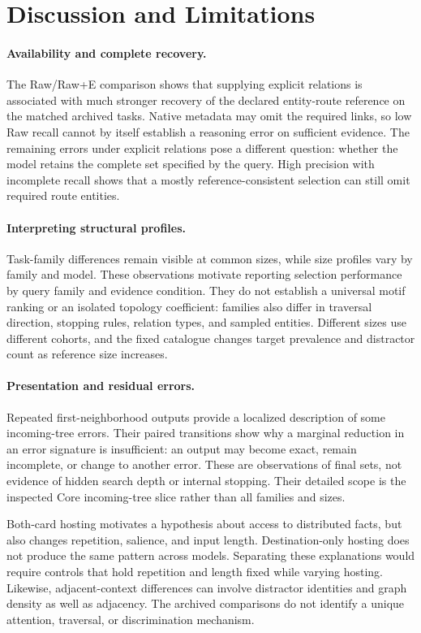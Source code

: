 \section{Discussion and Limitations}
\label{sec:discussion}
\paragraph{Availability and complete recovery.}
The Raw/Raw+E comparison shows that supplying explicit relations is associated with much stronger recovery of the declared entity-route reference on the matched archived tasks. Native metadata may omit the required links, so low Raw recall cannot by itself establish a reasoning error on sufficient evidence. The remaining errors under explicit relations pose a different question: whether the model retains the complete set specified by the query. High precision with incomplete recall shows that a mostly reference-consistent selection can still omit required route entities.

\paragraph{Interpreting structural profiles.}
Task-family differences remain visible at common sizes, while size profiles vary by family and model. These observations motivate reporting selection performance by query family and evidence condition. They do not establish a universal motif ranking or an isolated topology coefficient: families also differ in traversal direction, stopping rules, relation types, and sampled entities. Different sizes use different cohorts, and the fixed catalogue changes target prevalence and distractor count as reference size increases.

\paragraph{Presentation and residual errors.}
Repeated first-neighborhood outputs provide a localized description of some incoming-tree errors. Their paired transitions show why a marginal reduction in an error signature is insufficient: an output may become exact, remain incomplete, or change to another error. These are observations of final sets, not evidence of hidden search depth or internal stopping. Their detailed scope is the inspected Core incoming-tree slice rather than all families and sizes.

Both-card hosting motivates a hypothesis about access to distributed facts, but also changes repetition, salience, and input length. Destination-only hosting does not produce the same pattern across models. Separating these explanations would require controls that hold repetition and length fixed while varying hosting. Likewise, adjacent-context differences can involve distractor identities and graph density as well as adjacency. The archived comparisons do not identify a unique attention, traversal, or discrimination mechanism.

